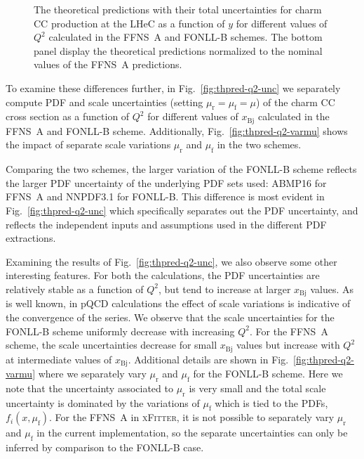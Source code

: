\documentclass[pdftex,twocolumn,epjc3]{svjour3}          %
\newcommand{\xfitter} {\textsc{xFitter}\xspace}
\newcommand{\xbj}{\ensuremath{x_{\text{Bj}}}\xspace}
\newcommand{\fonll} {{FONLL-B}\xspace}
\newcommand{\ffns} {{FFNS~A}\xspace}
\begin{document}
\begin{figure}
    \centering
    \caption{The theoretical predictions with their total
      uncertainties for charm CC production at the LHeC as a function
      of $y$ for different values of $Q^2$ calculated in the \ffns and
      \fonll schemes. The bottom panel display the theoretical
      predictions normalized to the nominal values of the \ffns
      predictions.}
    \label{fig:thpred-y}
\end{figure}

To examine these differences further, in Fig.~\ref{fig:thpred-q2-unc}
we separately compute PDF and scale uncertainties (setting
$\mu_\mathrm{r}=\mu_\mathrm{f}=\mu$) of the charm CC cross section as
a function of $Q^2$ for different values of \xbj calculated in the
\ffns and \fonll scheme.
%
Additionally, Fig.~\ref{fig:thpred-q2-varmu} shows the impact of
separate scale variations $\mu_\mathrm{r}$ and $\mu_\mathrm{f}$ in the
two schemes.

Comparing the two schemes, the larger variation of the \fonll scheme
reflects the larger PDF uncertainty of the underlying PDF sets used:
ABMP16 for \ffns and NNPDF3.1 for \fonll.
%
This difference is most evident in Fig.~\ref{fig:thpred-q2-unc} which
specifically separates out the PDF uncertainty, and reflects the
independent inputs and assumptions used in the different PDF
extractions.

Examining the results of Fig.~\ref{fig:thpred-q2-unc}, we also observe
some other interesting features.
%
For both the calculations, the PDF uncertainties are relatively stable
as a function of $Q^2$, but tend to increase at larger \xbj values.
%
As is well known, in pQCD calculations the effect of scale variations
is indicative of the convergence of the series.
%
We observe that the scale uncertainties for the \fonll scheme
uniformly decrease with increasing $Q^2$.
%
For the \ffns scheme, the scale uncertainties decrease for small \xbj
values but increase with $Q^2$ at intermediate values of \xbj.
%
Additional details are shown in Fig.~\ref{fig:thpred-q2-varmu} where
we separately vary $\mu_\mathrm{r}$ and $\mu_\mathrm{f}$ for the
\fonll scheme. Here we note that the uncertainty associated to
$\mu_\mathrm{r}$ is very small and the total scale uncertainty is
dominated by the variations of $\mu_\mathrm{f}$ which is tied to the
PDFs, $f_i(x,\mu_\mathrm{f})$.
%
For the \ffns in \xfitter, it is not possible to separately vary
$\mu_\mathrm{r}$ and $\mu_\mathrm{f}$ in the current implementation,
so the separate uncertainties can only be inferred by comparison to
the \fonll case.
\end{document}
